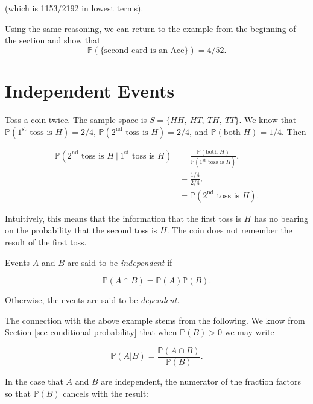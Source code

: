 \documentclass[]{book}
\numberwithin{equation}{chapter}
\numberwithin{figure}{chapter}
\theoremstyle{plain}
\theoremstyle{definition}
\theoremstyle{remark}
\theoremstyle{definition}
\theoremstyle{definition}
\theoremstyle{remark}
\let\BeginKnitrBlock\begin \let\EndKnitrBlock\end
\begin{document}
(which is 1153/2192 in lowest terms).

Using the same reasoning, we can return to the example from the
beginning of the section and show that \[ \mathbb{P}(\{ \mbox{second
card is an Ace} \} )=4/52.
\]

\section{Independent Events}\label{sec-independent-events}

Toss a coin twice. The sample space is \(S= \{ HH,\ HT,\ TH,\ TT \} \).
We know that \(\mathbb{P}(1^{\mathrm{st}}\mbox{ toss is }H)=2/4\),
\(\mathbb{P}(2^{\mathrm{nd}}\mbox{ toss is }H)=2/4\), and
\(\mathbb{P}(\mbox{both }H)=1/4\). Then

\begin{align*} 
\mathbb{P}(2^{\mathrm{nd}}\mbox{ toss is }H\ \vert \ 1^{\mathrm{st}}\mbox{ toss is }H) & =\frac{\mathbb{P}(\mbox{both }H)}{\mathbb{P}(1^{\mathrm{st}}\mbox{ toss is }H)}, \\
 & =\frac{1/4}{2/4},\\
 & =\mathbb{P}(2^{\mathrm{nd}}\mbox{ toss is }H).
\end{align*}

Intuitively, this means that the information that the first toss is
\(H\) has no bearing on the probability that the second toss is \(H\).
The coin does not remember the result of the first toss.

\bigskip

\BeginKnitrBlock{definition}
\protect\hypertarget{def:unnamed-chunk-169}{}{\label{def:unnamed-chunk-169}}Events
\(A\) and \(B\) are said to be \emph{independent} if

\begin{equation}
\mathbb{P}(A\cap B)=\mathbb{P}(A)\mathbb{P}(B).
\end{equation}

Otherwise, the events are said to be \emph{dependent}.
\EndKnitrBlock{definition}

The connection with the above example stems from the following. We know
from Section \ref{sec-conditional-probability} that when
\(\mathbb{P}(B)>0\) we may write

\begin{equation}
\mathbb{P}(A|B)=\frac{\mathbb{P}(A\cap B)}{\mathbb{P}(B)}.
\end{equation}

In the case that \(A\) and \(B\) are independent, the numerator of the
fraction factors so that \(\mathbb{P}(B)\) cancels with the result:
\end{document}
